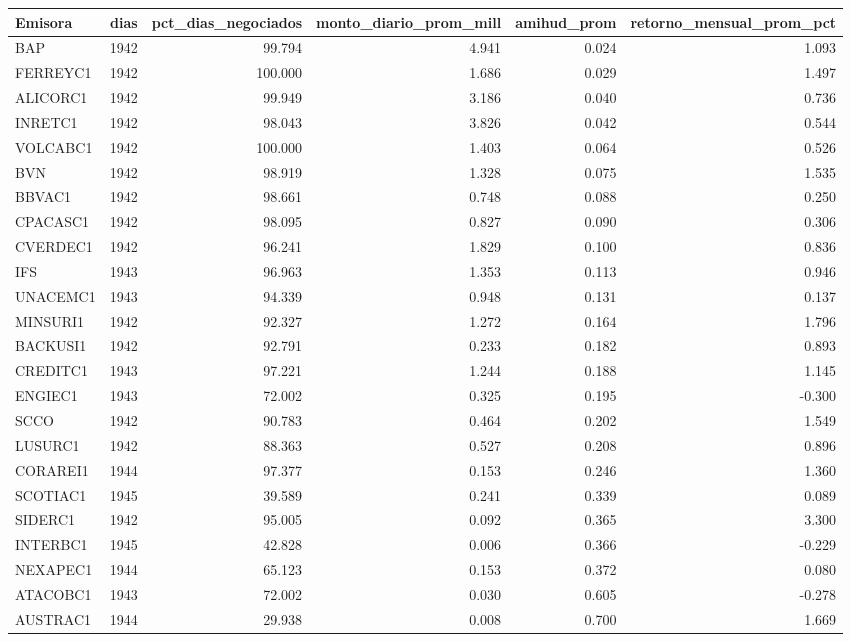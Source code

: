 \begin{tabular}{lrrrrr}
\toprule
Emisora & dias & pct\_dias\_negociados & monto\_diario\_prom\_mill & amihud\_prom & retorno\_mensual\_prom\_pct \\
\midrule
BAP & 1942 & 99.794 & 4.941 & 0.024 & 1.093 \\
FERREYC1 & 1942 & 100.000 & 1.686 & 0.029 & 1.497 \\
ALICORC1 & 1942 & 99.949 & 3.186 & 0.040 & 0.736 \\
INRETC1 & 1942 & 98.043 & 3.826 & 0.042 & 0.544 \\
VOLCABC1 & 1942 & 100.000 & 1.403 & 0.064 & 0.526 \\
BVN & 1942 & 98.919 & 1.328 & 0.075 & 1.535 \\
BBVAC1 & 1942 & 98.661 & 0.748 & 0.088 & 0.250 \\
CPACASC1 & 1942 & 98.095 & 0.827 & 0.090 & 0.306 \\
CVERDEC1 & 1942 & 96.241 & 1.829 & 0.100 & 0.836 \\
IFS & 1943 & 96.963 & 1.353 & 0.113 & 0.946 \\
UNACEMC1 & 1943 & 94.339 & 0.948 & 0.131 & 0.137 \\
MINSURI1 & 1942 & 92.327 & 1.272 & 0.164 & 1.796 \\
BACKUSI1 & 1942 & 92.791 & 0.233 & 0.182 & 0.893 \\
CREDITC1 & 1943 & 97.221 & 1.244 & 0.188 & 1.145 \\
ENGIEC1 & 1943 & 72.002 & 0.325 & 0.195 & -0.300 \\
SCCO & 1942 & 90.783 & 0.464 & 0.202 & 1.549 \\
LUSURC1 & 1942 & 88.363 & 0.527 & 0.208 & 0.896 \\
CORAREI1 & 1944 & 97.377 & 0.153 & 0.246 & 1.360 \\
SCOTIAC1 & 1945 & 39.589 & 0.241 & 0.339 & 0.089 \\
SIDERC1 & 1942 & 95.005 & 0.092 & 0.365 & 3.300 \\
INTERBC1 & 1945 & 42.828 & 0.006 & 0.366 & -0.229 \\
NEXAPEC1 & 1944 & 65.123 & 0.153 & 0.372 & 0.080 \\
ATACOBC1 & 1943 & 72.002 & 0.030 & 0.605 & -0.278 \\
AUSTRAC1 & 1944 & 29.938 & 0.008 & 0.700 & 1.669 \\
\bottomrule
\end{tabular}